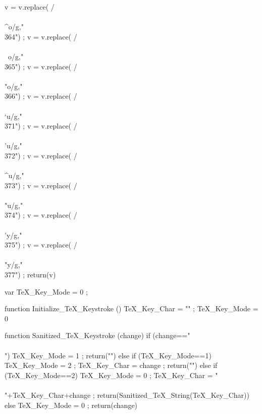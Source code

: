 {      v = v.replace(  /\\\\^o/g,"\\364") ;
      v = v.replace(  /\\\\~o/g,"\\365") ;
      v = v.replace(  /\\\\"o/g,"\\366") ;
      v = v.replace(  /\\\\`u/g,"\\371") ;
      v = v.replace(  /\\\\'u/g,"\\372") ;
      v = v.replace(  /\\\\^u/g,"\\373") ;
      v = v.replace(  /\\\\"u/g,"\\374") ;
      v = v.replace(  /\\\\'y/g,"\\375") ;
      v = v.replace(  /\\\\"y/g,"\\377") ;
      return(v) }

  var TeX_Key_Mode = 0 ;

  function Initialize_TeX_Keystroke ()
    { TeX_Key_Char = "" ;
      TeX_Key_Mode = 0 }

  function Sanitized_TeX_Keystroke (change)
    { if (change=="\\\\")
        { TeX_Key_Mode = 1 ;
          return("") }
      else if (TeX_Key_Mode==1)
        { TeX_Key_Mode = 2 ;
          TeX_Key_Char = change ;
          return("") }
      else if (TeX_Key_Mode==2)
        { TeX_Key_Mode = 0 ;
          TeX_Key_Char = "\\\\"+TeX_Key_Char+change ;
          return(Sanitized_TeX_String(TeX_Key_Char)) }
      else
        { TeX_Key_Mode = 0 ;
          return(change) } }

